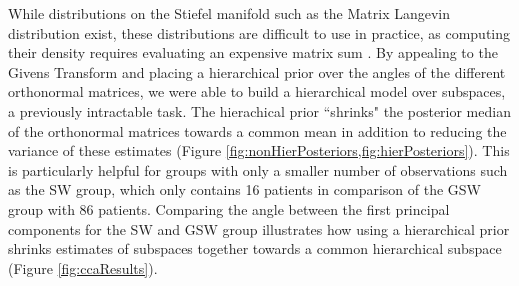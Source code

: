 \documentclass{article}
\begin{document}
While distributions on the Stiefel manifold such as the Matrix Langevin distribution \citep{muirhead2009aspects} exist, these distributions are difficult to use in practice, as computing their density requires evaluating an expensive matrix sum \citep{hoff2009simulation}. By appealing to the Givens Transform and placing a hierarchical prior over the angles of the different orthonormal matrices, we were able to build a hierarchical model over subspaces, a previously intractable task. The hierachical prior ``shrinks" the posterior median of the orthonormal matrices towards a common mean in addition to reducing the variance of these estimates (Figure \ref{fig:nonHierPosteriors,fig:hierPosteriors}). This is particularly helpful for groups with only a smaller number of observations such as the SW group, which only contains 16 patients in comparison of the GSW group with 86 patients. Comparing the angle between the first principal components for the SW and GSW group illustrates how using a hierarchical prior shrinks estimates of subspaces together towards a common hierarchical subspace (Figure \ref{fig:ccaResults}).
\end{document}
